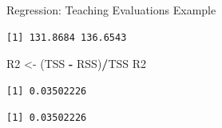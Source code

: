 \documentclass[
  ignorenonframetext,
]{beamer}
\newenvironment{Shaded}{\begin{snugshade}}{\end{snugshade}}
\newcommand{\CommentTok}[1]{\textcolor[rgb]{0.56,0.35,0.01}{\textit{#1}}}
\newcommand{\DecValTok}[1]{\textcolor[rgb]{0.00,0.00,0.81}{#1}}
\newcommand{\FunctionTok}[1]{\textcolor[rgb]{0.13,0.29,0.53}{\textbf{#1}}}
\newcommand{\NormalTok}[1]{#1}
\newcommand{\OtherTok}[1]{\textcolor[rgb]{0.56,0.35,0.01}{#1}}
\newcommand{\SpecialCharTok}[1]{\textcolor[rgb]{0.81,0.36,0.00}{\textbf{#1}}}
\begin{document}
\begin{frame}[fragile]{Regression: Teaching Evaluations Example}
\protect\hypertarget{regression-teaching-evaluations-example-12}{}
\tiny

\begin{Shaded}
\end{Shaded}

\begin{verbatim}
[1] 131.8684 136.6543
\end{verbatim}

\begin{Shaded}
\begin{Highlighting}[]
\NormalTok{R2 }\OtherTok{\textless{}{-}}\NormalTok{ (TSS }\SpecialCharTok{{-}}\NormalTok{ RSS)}\SpecialCharTok{/}\NormalTok{TSS}
\NormalTok{R2}
\end{Highlighting}
\end{Shaded}

\begin{verbatim}
[1] 0.03502226
\end{verbatim}

\begin{Shaded}
\end{Shaded}

\begin{verbatim}
[1] 0.03502226
\end{verbatim}

\normalsize
\end{frame}
\end{document}
